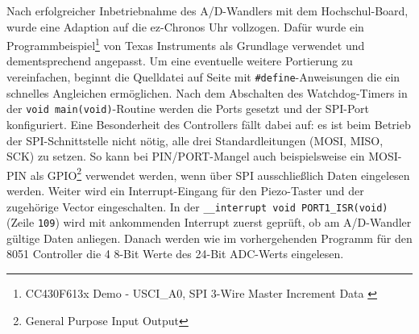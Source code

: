 \documentclass[12pt]{scrreprt} %
\begin{document}
Nach erfolgreicher Inbetriebnahme des A/D-Wandlers mit dem Hochschul-Board, wurde eine Adaption auf die ez-Chronos Uhr vollzogen. Dafür wurde ein Programmbeispiel\footnote{CC430F613x Demo - USCI\_A0, SPI 3-Wire Master Increment Data \citep{CC430f6137}} von Texas Instruments als Grundlage verwendet und dementsprechend angepasst. Um eine eventuelle weitere Portierung zu vereinfachen, beginnt die Quelldatei auf Seite \pageref{CC430_ADS1232} mit \lstinline$#define$-Anweisungen die ein schnelles Angleichen ermöglichen. Nach dem Abschalten des Watchdog-Timers in der \lstinline$void main(void)$-Routine werden die Ports gesetzt und der SPI-Port konfiguriert. Eine Besonderheit des Controllers fällt dabei auf: es ist beim Betrieb der SPI-Schnittstelle nicht nötig, alle drei Standardleitungen (MOSI, MISO, SCK) zu setzen. So kann bei PIN/PORT-Mangel auch beispielsweise ein MOSI-PIN als GPIO\footnote{General Purpose Input Output} verwendet werden, wenn über SPI ausschließlich Daten eingelesen werden. Weiter wird ein Interrupt-Eingang für den Piezo-Taster und der zugehörige Vector eingeschalten. 
In der \lstinline$__interrupt void PORT1_ISR(void)$ (Zeile \texttt{109}) wird mit ankommenden Interrupt zuerst geprüft, ob am A/D-Wandler gültige Daten anliegen. Danach werden wie im vorhergehenden Programm für den 8051 Controller die 4 8-Bit Werte des 24-Bit ADC-Werts eingelesen.
\newpage

\newpage

\newpage

\end{document}
